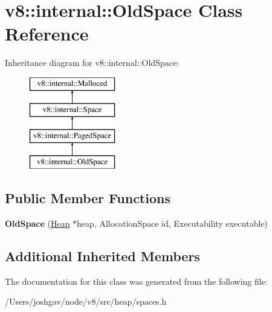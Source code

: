 \hypertarget{classv8_1_1internal_1_1_old_space}{}\section{v8\+:\+:internal\+:\+:Old\+Space Class Reference}
\label{classv8_1_1internal_1_1_old_space}
Inheritance diagram for v8\+:\+:internal\+:\+:Old\+Space\+:\begin{figure}[H]
\begin{center}
\leavevmode
\includegraphics[height=4.000000cm]{classv8_1_1internal_1_1_old_space}
\end{center}
\end{figure}
\subsection*{Public Member Functions}
\begin{DoxyCompactItemize}
\item 
{\bfseries Old\+Space} (\hyperlink{classv8_1_1internal_1_1_heap}{Heap} $\ast$heap, Allocation\+Space id, Executability executable)\hypertarget{classv8_1_1internal_1_1_old_space_aa57bec3da46095165f89c2d97c9253b9}{}\label{classv8_1_1internal_1_1_old_space_aa57bec3da46095165f89c2d97c9253b9}

\end{DoxyCompactItemize}
\subsection*{Additional Inherited Members}


The documentation for this class was generated from the following file\+:\begin{DoxyCompactItemize}
\item 
/\+Users/joshgav/node/v8/src/heap/spaces.\+h\end{DoxyCompactItemize}
